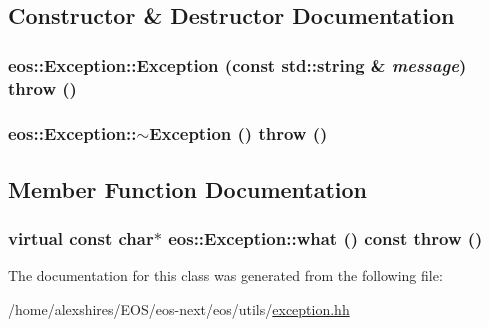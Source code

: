 \subsection{Constructor \& Destructor Documentation}
\hypertarget{classeos_1_1Exception_acbc0fa64ca3d54cc1f828b07dc80e585}{
\subsubsection[{Exception}]{\setlength{\rightskip}{0pt plus 5cm}eos::Exception::Exception (const std::string \& {\em message})  throw ()}}
\label{classeos_1_1Exception_acbc0fa64ca3d54cc1f828b07dc80e585}
\hypertarget{classeos_1_1Exception_a8cb6faea0484cc58c472da9e58c7c30a}{
\subsubsection[{$\sim$Exception}]{\setlength{\rightskip}{0pt plus 5cm}eos::Exception::$\sim$Exception ()  throw ()}}
\label{classeos_1_1Exception_a8cb6faea0484cc58c472da9e58c7c30a}


\subsection{Member Function Documentation}
\hypertarget{classeos_1_1Exception_adce7a2af080165b09a599bb13438a8e1}{
\subsubsection[{what}]{\setlength{\rightskip}{0pt plus 5cm}virtual const char$\ast$ eos::Exception::what () const  throw ()}}
\label{classeos_1_1Exception_adce7a2af080165b09a599bb13438a8e1}


The documentation for this class was generated from the following file:\begin{DoxyCompactItemize}
\item 
/home/alexshires/EOS/eos-\/next/eos/utils/\hyperlink{exception_8hh}{exception.hh}\end{DoxyCompactItemize}
